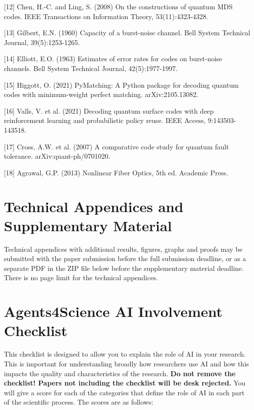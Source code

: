 \documentclass{article}
\begin{document}
{[12] Chen, H.-C. and Ling, S. (2008) On the constructions of quantum MDS codes. IEEE Transactions on Information Theory, 53(11):4323-4328.

[13] Gilbert, E.N. (1960) Capacity of a burst-noise channel. Bell System Technical Journal, 39(5):1253-1265.

[14] Elliott, E.O. (1963) Estimates of error rates for codes on burst-noise channels. Bell System Technical Journal, 42(5):1977-1997.

[15] Higgott, O. (2021) PyMatching: A Python package for decoding quantum codes with minimum-weight perfect matching. arXiv:2105.13082.

[16] Valls, V. et al. (2021) Decoding quantum surface codes with deep reinforcement learning and probabilistic policy reuse. IEEE Access, 9:143503-143518.

[17] Cross, A.W. et al. (2007) A comparative code study for quantum fault tolerance. arXiv:quant-ph/0701020.

[18] Agrawal, G.P. (2013) Nonlinear Fiber Optics, 5th ed. Academic Press.

}

\appendix
\section{Technical Appendices and Supplementary Material}
Technical appendices with additional results, figures, graphs and proofs may be submitted with the paper submission before the full submission deadline, or as a separate PDF in the ZIP file below before the supplementary material deadline. There is no page limit for the technical appendices.

\newpage

\section*{Agents4Science AI Involvement Checklist}

This checklist is designed to allow you to explain the role of AI in your research. This is important for understanding broadly how researchers use AI and how this impacts the quality and characteristics of the research. \textbf{Do not remove the checklist! Papers not including the checklist will be desk rejected.} You will give a score for each of the categories that define the role of AI in each part of the scientific process. The scores are as follows:
\end{document}
